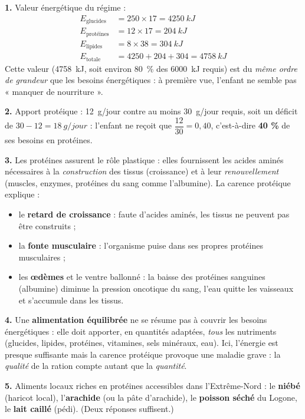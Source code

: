\documentclass[11pt]{article}
\newcommand{\cle}[1]{{\popxbold\color{popdark}#1}}
\begin{document}
\begin{corrige}
\textbf{1.} Valeur énergétique du régime :
\begin{align*}
E_{\text{glucides}} &= 250 \times 17 = \SI{4250}{kJ}\\
E_{\text{protéines}} &= 12 \times 17 = \SI{204}{kJ}\\
E_{\text{lipides}} &= 8 \times 38 = \SI{304}{kJ}\\
E_{\text{totale}} &= 4250 + 204 + 304 = \SI{4758}{kJ}
\end{align*}
Cette valeur (\SI{4758}{kJ}, soit environ \SI{80}{\%} des \SI{6000}{kJ} requis) est du \emph{même ordre de grandeur} que les besoins énergétiques : à première vue, l'enfant ne semble pas « manquer de nourriture ».

\textbf{2.} Apport protéique : \SI{12}{g/jour} contre au moins \SI{30}{g/jour} requis, soit un déficit de $30 - 12 = \SI{18}{g/jour}$ : l'enfant ne reçoit que $\dfrac{12}{30} = 0{,}40$, c'est-à-dire \textbf{40 \%} de ses besoins en protéines.

\textbf{3.} Les protéines assurent le \cle{rôle plastique} : elles fournissent les acides aminés nécessaires à la \emph{construction} des tissus (croissance) et à leur \emph{renouvellement} (muscles, enzymes, protéines du sang comme l'albumine). La carence protéique explique :
\begin{itemize}
\item le \textbf{retard de croissance} : faute d'acides aminés, les tissus ne peuvent pas être construits ;
\item la \textbf{fonte musculaire} : l'organisme puise dans ses propres protéines musculaires ;
\item les \textbf{œdèmes} et le ventre ballonné : la baisse des protéines sanguines (albumine) diminue la \cle{pression oncotique} du sang, l'eau quitte les vaisseaux et s'accumule dans les tissus.
\end{itemize}

\textbf{4.} Une \textbf{alimentation équilibrée} ne se résume pas à couvrir les besoins énergétiques : elle doit apporter, en quantités adaptées, \emph{tous} les nutriments (glucides, lipides, protéines, vitamines, sels minéraux, eau). Ici, l'énergie est presque suffisante mais la carence protéique provoque une maladie grave : la \emph{qualité} de la ration compte autant que la \emph{quantité}.

\textbf{5.} Aliments locaux riches en protéines accessibles dans l'Extrême-Nord : le \textbf{niébé} (haricot local), l'\textbf{arachide} (ou la pâte d'arachide), le \textbf{poisson séché} du Logone, le \textbf{lait caillé} (pédi). (Deux réponses suffisent.)


\end{corrige}
\end{document}
